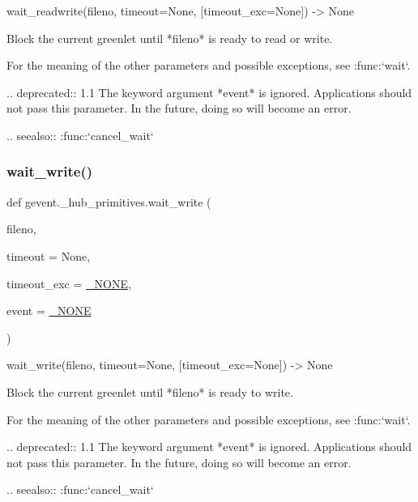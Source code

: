 \begin{DoxyVerb}wait_readwrite(fileno, timeout=None, [timeout_exc=None]) -> None

Block the current greenlet until *fileno* is ready to read or
write.

For the meaning of the other parameters and possible exceptions,
see :func:`wait`.

.. deprecated:: 1.1
   The keyword argument *event* is ignored. Applications should not pass this parameter.
   In the future, doing so will become an error.

.. seealso:: :func:`cancel_wait`
\end{DoxyVerb}
 \mbox{\label{namespacegevent_1_1__hub__primitives_ad85018e5bc9d1b852a8d111fa5ad1b6f}} 
\subsubsection{\texorpdfstring{wait\+\_\+write()}{wait\_write()}}
{\footnotesize\ttfamily def gevent.\+\_\+hub\+\_\+primitives.\+wait\+\_\+write (\begin{DoxyParamCaption}\item[{}]{fileno,  }\item[{}]{timeout = {\ttfamily None},  }\item[{}]{timeout\+\_\+exc = {\ttfamily \hyperlink{classgevent_1_1__util_1_1___n_o_n_e}{\+\_\+\+N\+O\+NE}},  }\item[{}]{event = {\ttfamily \hyperlink{classgevent_1_1__util_1_1___n_o_n_e}{\+\_\+\+N\+O\+NE}} }\end{DoxyParamCaption})}

\begin{DoxyVerb}wait_write(fileno, timeout=None, [timeout_exc=None]) -> None

Block the current greenlet until *fileno* is ready to write.

For the meaning of the other parameters and possible exceptions,
see :func:`wait`.

.. deprecated:: 1.1
   The keyword argument *event* is ignored. Applications should not pass this parameter.
   In the future, doing so will become an error.

.. seealso:: :func:`cancel_wait`
\end{DoxyVerb}
 